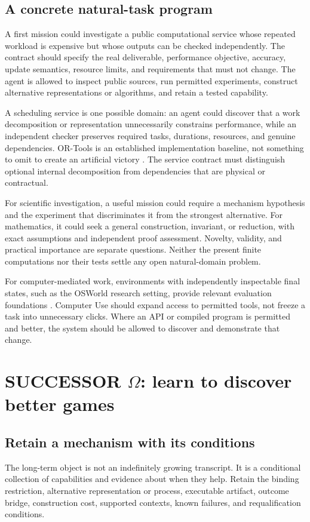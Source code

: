\documentclass[11pt,letterpaper]{article}
\theoremstyle{remark}\newtheorem{remark}{Remark}[section]
\begin{document}
\subsection{A concrete natural-task program}
A first mission could investigate a public computational service whose repeated workload is expensive but whose outputs can be checked independently. The contract should specify the real deliverable, performance objective, accuracy, update semantics, resource limits, and requirements that must not change. The agent is allowed to inspect public sources, run permitted experiments, construct alternative representations or algorithms, and retain a tested capability.

A scheduling service is one possible domain: an agent could discover that a work decomposition or representation unnecessarily constrains performance, while an independent checker preserves required tasks, durations, resources, and genuine dependencies. OR-Tools is an established implementation baseline, not something to omit to create an artificial victory \citep{ortools}. The service contract must distinguish optional internal decomposition from dependencies that are physical or contractual.

For scientific investigation, a useful mission could require a mechanism hypothesis and the experiment that discriminates it from the strongest alternative. For mathematics, it could seek a general construction, invariant, or reduction, with exact assumptions and independent proof assessment. Novelty, validity, and practical importance are separate questions. Neither the present finite computations nor their tests settle any open natural-domain problem.

For computer-mediated work, environments with independently inspectable final states, such as the OSWorld research setting, provide relevant evaluation foundations \citep{xie2024osworld}. Computer Use should expand access to permitted tools, not freeze a task into unnecessary clicks. Where an API or compiled program is permitted and better, the system should be allowed to discover and demonstrate that change.

\section{SUCCESSOR \texorpdfstring{$\Omega$}{Omega}: learn to discover better games}\label{sec:successor}
\subsection{Retain a mechanism with its conditions}
The long-term object is not an indefinitely growing transcript. It is a conditional collection of capabilities and evidence about when they help. Retain the binding restriction, alternative representation or process, executable artifact, outcome bridge, construction cost, supported contexts, known failures, and requalification conditions.
\end{document}
